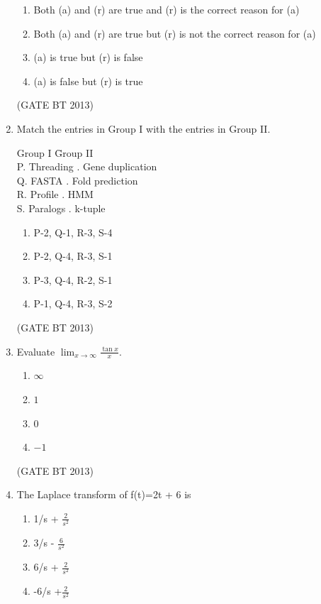 \documentclass[journal,12pt,onecolumn]{IEEEtran}
\theoremstyle{remark}
\begin{document}
\begin{enumerate}
\begin{enumerate}
    \item Both (a) and (r) are true and (r) is the correct reason for (a)
    \item Both (a) and (r) are true but (r) is not the correct reason for (a)
    \item (a) is true but (r) is false
    \item (a) is false but (r) is true
\end{enumerate} \hfill(GATE BT 2013)

\item 

Match the entries in Group I with the entries in Group II.

\begin{tabbing}
Group I \hspace{3.5cm} \= Group II \\
P. Threading . Gene duplication \\
Q. FASTA . Fold prediction \\
R. Profile . HMM \\
S. Paralogs . k-tuple \\
\end{tabbing}

\begin{enumerate}
    \item P-2, Q-1, R-3, S-4
    \item P-2, Q-4, R-3, S-1
    \item P-3, Q-4, R-2, S-1
    \item P-1, Q-4, R-3, S-2
\end{enumerate} \hfill(GATE BT 2013)

\item 

Evaluate \(\displaystyle \lim_{x \to \infty} \frac{\tan x}{x}\).

\begin{enumerate}
    \item \(\infty\)
    \item $1$
    \item $0$
    \item $-1$
\end{enumerate} \hfill(GATE BT 2013)

\item 

The Laplace transform of f(t)=2t + 6 is 

\begin{enumerate}
    \item 1/s + \( \frac{2}{s^2} \)
    \item 3/s - \(\frac{6}{s^2}\)
    \item 6/s + \(\frac{2}{s^2}\)
    \item -6/s +\(\frac{2}{s^2}\)


\end{enumerate}
\end{enumerate}
\end{document}
